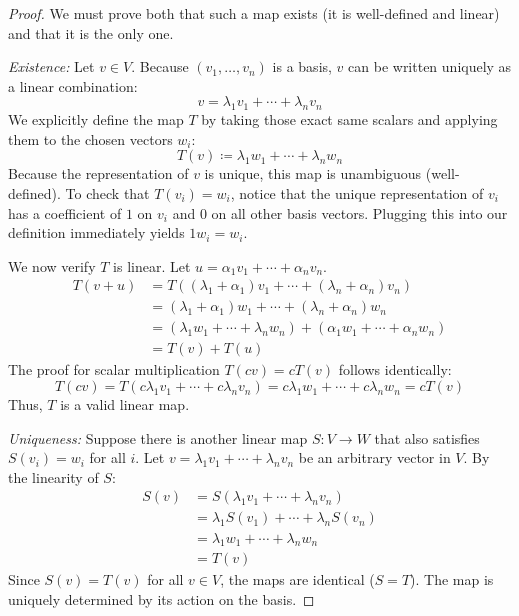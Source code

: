 \documentclass[../linear_algebra_and_groups.tex]{subfiles}
\begin{document}
\begin{proof}
    We must prove both that such a map exists (it is well-defined and linear) and that it is the only one.

    \textit{Existence:} Let $v \in V$. Because $(v_1, \dots, v_n)$ is a basis, $v$ can be written uniquely as a linear combination:
    \[ v = \lambda_1 v_1 + \cdots + \lambda_n v_n \]
    We explicitly define the map $T$ by taking those exact same scalars and applying them to the chosen vectors $w_i$:
    \[ T(v) \coloneqq \lambda_1 w_1 + \cdots + \lambda_n w_n \]
    Because the representation of $v$ is unique, this map is unambiguous (well-defined). To check that $T(v_i) = w_i$, notice that the unique representation of $v_i$ has a coefficient of $1$ on $v_i$ and $0$ on all other basis vectors. Plugging this into our definition immediately yields $1w_i = w_i$.

    We now verify $T$ is linear. Let $u = \alpha_1 v_1 + \cdots + \alpha_n v_n$.
    \begin{align*}
        T(v + u) &= T((\lambda_1 + \alpha_1)v_1 + \cdots + (\lambda_n + \alpha_n)v_n) \\
        &= (\lambda_1 + \alpha_1)w_1 + \cdots + (\lambda_n + \alpha_n)w_n \\
        &= (\lambda_1 w_1 + \cdots + \lambda_n w_n) + (\alpha_1 w_1 + \cdots + \alpha_n w_n) \\
        &= T(v) + T(u)
    \end{align*}
    The proof for scalar multiplication $T(cv) = cT(v)$ follows identically:
    \[ T(cv) = T(c\lambda_1 v_1 + \cdots + c\lambda_n v_n) = c\lambda_1 w_1 + \cdots + c\lambda_n w_n = cT(v) \]
    Thus, $T$ is a valid linear map.

    \textit{Uniqueness:} Suppose there is another linear map $S: V \to W$ that also satisfies $S(v_i) = w_i$ for all $i$. Let $v = \lambda_1 v_1 + \cdots + \lambda_n v_n$ be an arbitrary vector in $V$. By the linearity of $S$:
    \begin{align*}
        S(v) &= S(\lambda_1 v_1 + \cdots + \lambda_n v_n) \\
        &= \lambda_1 S(v_1) + \cdots + \lambda_n S(v_n) \\
        &= \lambda_1 w_1 + \cdots + \lambda_n w_n \\
        &= T(v)
    \end{align*}
    Since $S(v) = T(v)$ for all $v \in V$, the maps are identical ($S = T$). The map is uniquely determined by its action on the basis.\qedhere
\end{proof}
\end{document}
